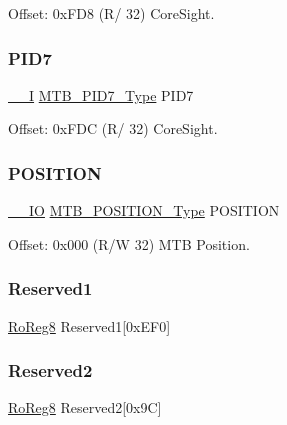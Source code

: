 Offset\+: 0x\+F\+D8 (R/ 32) Core\+Sight. 

\mbox{\label{struct_mtb_ad4eeeae421a4ef2b6db6e5fdc5e1cb01}} 
\subsubsection{\texorpdfstring{PID7}{PID7}}
{\footnotesize\ttfamily \mbox{\hyperlink{core__cm0plus_8h_af63697ed9952cc71e1225efe205f6cd3}{\+\_\+\+\_\+I}} \mbox{\hyperlink{union_m_t_b___p_i_d7___type}{M\+T\+B\+\_\+\+P\+I\+D7\+\_\+\+Type}} P\+I\+D7}



Offset\+: 0x\+F\+DC (R/ 32) Core\+Sight. 

\mbox{\label{struct_mtb_a7d1d53cd1d4146a97fb88e68e21de82f}} 
\subsubsection{\texorpdfstring{POSITION}{POSITION}}
{\footnotesize\ttfamily \mbox{\hyperlink{core__cm0plus_8h_aec43007d9998a0a0e01faede4133d6be}{\+\_\+\+\_\+\+IO}} \mbox{\hyperlink{union_m_t_b___p_o_s_i_t_i_o_n___type}{M\+T\+B\+\_\+\+P\+O\+S\+I\+T\+I\+O\+N\+\_\+\+Type}} P\+O\+S\+I\+T\+I\+ON}



Offset\+: 0x000 (R/W 32) M\+TB Position. 

\mbox{\label{struct_mtb_aa2f0dd1af088549568cc40e80212606c}} 
\subsubsection{\texorpdfstring{Reserved1}{Reserved1}}
{\footnotesize\ttfamily \mbox{\hyperlink{group___s_a_m_d21_e15_a__definitions_ga0d957f1433aaf5d70e4dc2b68288442d}{Ro\+Reg8}} Reserved1\mbox{[}0x\+E\+F0\mbox{]}}

\mbox{\label{struct_mtb_a69c8a77ebefe06c9f0eb3c710d5a7c56}} 
\subsubsection{\texorpdfstring{Reserved2}{Reserved2}}
{\footnotesize\ttfamily \mbox{\hyperlink{group___s_a_m_d21_e15_a__definitions_ga0d957f1433aaf5d70e4dc2b68288442d}{Ro\+Reg8}} Reserved2\mbox{[}0x9\+C\mbox{]}}

